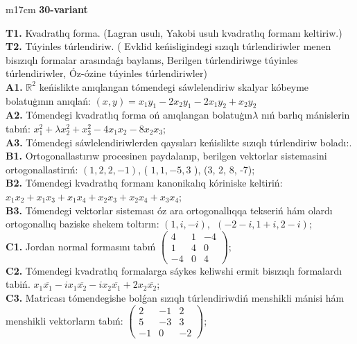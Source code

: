 \documentclass{article}
\begin{document}
\begin{tabular}{m{17cm}}
\textbf{30-variant}
\newline

\textbf{T1.} Kvadratlıq forma. (Lagran usulı, Yakobi usulı kvadratlıq formanı keltiriw.) \\
\textbf{T2.} Túyinles túrlendiriw. ( Evklid keńisligindegi sızıqlı túrlendiriwler menen bisızıqlı formalar arasındaǵı baylanıs, Berilgen túrlendiriwge túyinles túrlendiriwler, Óz-ózine túyinles túrlendiriwler) \\
\textbf{A1.} \(\mathbb{R}^{2}\) keńislikte anıqlangan tómendegi sáwlelendiriw skalyar kóbeyme bolatuģının anıqlań: \((x,y) = x_{1}y_{1} - 2x_{2}y_{1} - 2x_{1}y_{2} + x_{2}y_{2}\) \\
\textbf{A2.} Tómendegi kvadratlıq forma oń anıqlangan bolatuģın\(\lambda\) nıń barlıq mánislerin tabıń: \(x_{1}^{2} + \lambda x_{2}^{2} + x_{3}^{2} - 4x_{1}x_{2} - 8x_{2}x_{3}\); \\
\textbf{A3.} Tómendegi sáwlelendiriwlerden qaysıları keńislikte sızıqlı túrlendiriw boladı:. \\
\textbf{B1.} Ortogonallastırıw procesinen paydalanıp, berilgen vektorlar sistemasini ortogonallastirıń: \((1,2,2, - 1)\), ( \(1,1, - 5,3\) ), (3, 2, 8, -7); \\
\textbf{B2.} Tómendegi kvadratlıq formanı kanonikalıq kóriniske keltiriń: \(x_{1}x_{2} + x_{1}x_{3} + x_{1}x_{4} + x_{2}x_{3} + x_{2}x_{4} + x_{3}x_{4}\); \\
\textbf{B3.} Tómendegi vektorlar sisteması óz ara ortogonallıqqa tekseriń hám olardı ortogonallıq baziske shekem toltırın: \((1,i, - i),\ \ ( - 2 - i,1 + i,2 - i)\); \\
\textbf{C1.} Jordan normal formasını tabıń \(\begin{pmatrix} 4 & 1 & - 4 \\ 1 & 4 & 0 \\  - 4 & 0 & 4 \end{pmatrix}\); \\
\textbf{C2.} Tómendegi kvadratlıq formalarga sáykes keliwshi ermit bisızıqlı formalardı tabiń. \(x_{1}\overline{x_{1}} - ix_{1}\overline{x_{2}} - ix_{2}\overline{x_{1}} + 2x_{2}\overline{x_{2}}\); \\
\textbf{C3.} Matricası tómendegishe bolǵan sızıqlı túrlendiriwdiń menshikli mánisi hám menshikli vektorların tabıń: \(\begin{pmatrix} 2 & - 1 & 2 \\ 5 & - 3 & 3 \\  - 1 & 0 & - 2 \end{pmatrix}\); \\

\end{tabular}
\vspace{1cm}
\end{document}
